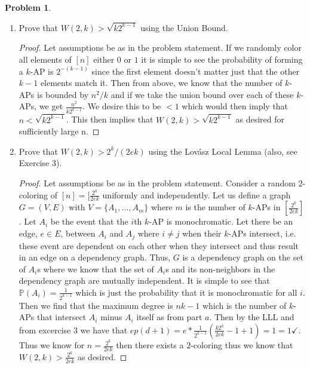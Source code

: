 \documentclass[11pt, letter]{amsart}
\theoremstyle{definition}
\newtheorem{problem}{Problem}[]
\newcommand{\p}[0]{\mathbb{P}}
\begin{document}
\begin{problem}
\begin{enumerate}[label=(\alph*)]
  \item Prove that $W(2, k) > \sqrt{k 2^{k - 1}}$ using the Union Bound.

    \begin{proof}
        Let assumptions be as in the problem statement. If we randomly color all elements of $[n]$ either $0$ or $1$ it is simple to see the probability of forming a $k$-AP is $2^{-(k-1)}$ since the first element doesn't matter just that the other $k - 1$ elements match it. Then from above, we know that the number of $k$-APs is bounded by $n^2/k$ and if we take the union bound over each of these $k$-APs, we get $\frac{n^2}{k2^{k-1}}$. We desire this to be $< 1$ which would then imply that $n < \sqrt{k2^{k-1}}$. This then implies that $W(2, k) > \sqrt{k2^{k-1}}$ as desired for sufficiently large n. 
    \end{proof}
  
  \item Prove that $W(2, k) > 2^k / (2ek)$ using the Lov\'asz Local Lemma (also, see Exercise 3).

    \begin{proof}
        Let assumptions be as in the problem statement. Consider a random $2$-coloring of $[n] = [\frac{2^k}{2ek}$ uniformly and independently. Let us define a graph $G = (V, E)$ with $V = \{A_1, ..., A_m\}$ where $m$ is the number of $k$-APs in $[\frac{2^k}{2ek}]$. Let $A_i$ be the event that the $i$th $k$-AP is monochromatic. Let there be an edge, $e\in E$, between $A_i$ and $A_j$ where $i\neq j$ when their $k$-APs intersect, i.e. these event are dependent on each other when they intersect and thus result in an edge on a dependency graph. Thus, $G$ is a dependency graph on the set of $A_i$s where we know that the set of $A_i$s and its non-neighbors in the dependency graph are mutually independent. It is simple to see that $\p(A_i) = \frac{1}{2^{k-1}}$ which is just the probability that it is monochromatic for all $i$. Then we find that the maximum degree is $nk-1$ which is the number of $k$-APs that intersect $A_i$ minus $A_i$ itself as from part $a$. Then by the LLL and from excercise 3 we have that $ep(d + 1) = e * \frac{1}{2^{k - 1}} (\frac{k2^k}{2ek} - 1 + 1) = 1 = 1 \checkmark$. Thus we know for $n = \frac{2^k}{2ek}$ then there exists a $2$-coloring thus we know that $W(2, k) > \frac{2^k}{2ek}$ as desired.
    \end{proof}
  
  \end{enumerate}
\end{problem}
\end{document}

